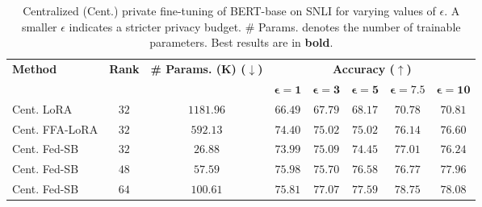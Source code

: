 \begin{table*}[!h]
\centering
\setlength{\tabcolsep}{4.5pt}
\small
\begin{tabular}{lcc|ccccc}
\toprule
\multirow{2}{*}{\bf Method} & \multirow{2}{*}{\bf Rank} & \multirow{2}{*}{\bf \# Params. (K) ($\downarrow$)} & \multicolumn{5}{c}{\textbf{Accuracy ($\uparrow$)}} \\
 &  &  & $\mathbf{\epsilon=1}$ & $\mathbf{\epsilon=3}$ & $\mathbf{\epsilon=5}$ & $\mathbf{\epsilon=7.5}$ & $\mathbf{\epsilon=10}$ \\
\midrule
Cent. LoRA & $32$ & $1181.96$ & $66.49$ & $67.79$ & $68.17$ & $70.78$ & $70.81$  \\
Cent. FFA-LoRA   & $32$ & $592.13$ &  $74.40$ & $75.02$ & $75.02$ & $76.14$ & $76.60$  \\
\rowcolor{cyan!10} 
Cent. Fed-SB & $32$ & $26.88$  & $73.99$ & $75.09$ & $74.45$ & $77.01$ & $76.24$  \\
\rowcolor{cyan!10} 
Cent. Fed-SB & $48$ & $57.59$  & $\mathbf{75.98}$ & $75.70$ & $76.58$ & $76.77$ & $77.96$ \\
\rowcolor{cyan!10} 
Cent. Fed-SB & $64$ & $100.61$ & $75.81$  & $\mathbf{77.07}$& $\mathbf{77.59}$ & $\mathbf{78.75}$ & $\mathbf{78.08}$\\
\bottomrule
\end{tabular}
\caption{Centralized (Cent.) private fine-tuning of BERT-base on SNLI for varying values of $\epsilon$. A smaller $\epsilon$ indicates a stricter privacy budget. \# Params. denotes the number of trainable parameters. Best results are in \textbf{bold}.
}
\label{tab:dp-central}
\end{table*}

